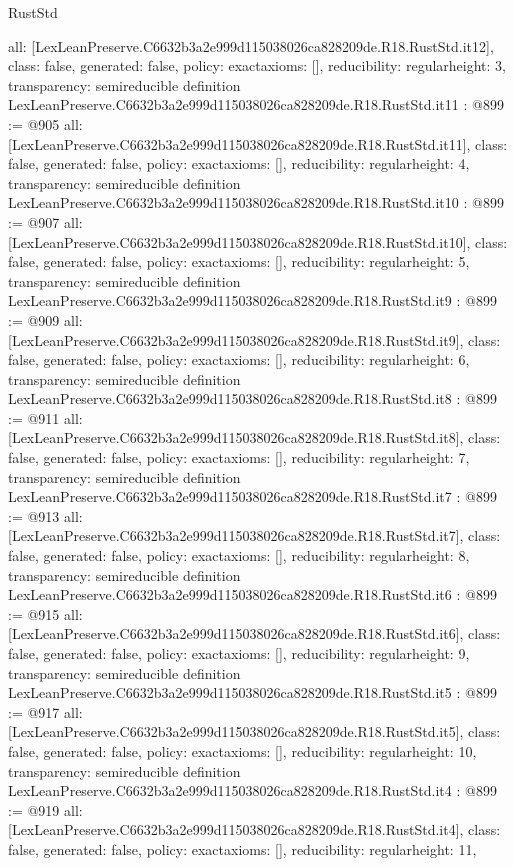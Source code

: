 \begin{lexlean}{RustStd}
\begin{coremodule}
{  all: [LexLeanPreserve.C6632b3a2e999d115038026ca828209de.R18.RustStd.it12],
  class: false,
  generated: false,
  policy: exact{axioms: []},
  reducibility: regular{height: 3},
  transparency: semireducible
}
definition LexLeanPreserve.C6632b3a2e999d115038026ca828209de.R18.RustStd.it11 : @899 := @905 {
  all: [LexLeanPreserve.C6632b3a2e999d115038026ca828209de.R18.RustStd.it11],
  class: false,
  generated: false,
  policy: exact{axioms: []},
  reducibility: regular{height: 4},
  transparency: semireducible
}
definition LexLeanPreserve.C6632b3a2e999d115038026ca828209de.R18.RustStd.it10 : @899 := @907 {
  all: [LexLeanPreserve.C6632b3a2e999d115038026ca828209de.R18.RustStd.it10],
  class: false,
  generated: false,
  policy: exact{axioms: []},
  reducibility: regular{height: 5},
  transparency: semireducible
}
definition LexLeanPreserve.C6632b3a2e999d115038026ca828209de.R18.RustStd.it9 : @899 := @909 {
  all: [LexLeanPreserve.C6632b3a2e999d115038026ca828209de.R18.RustStd.it9],
  class: false,
  generated: false,
  policy: exact{axioms: []},
  reducibility: regular{height: 6},
  transparency: semireducible
}
definition LexLeanPreserve.C6632b3a2e999d115038026ca828209de.R18.RustStd.it8 : @899 := @911 {
  all: [LexLeanPreserve.C6632b3a2e999d115038026ca828209de.R18.RustStd.it8],
  class: false,
  generated: false,
  policy: exact{axioms: []},
  reducibility: regular{height: 7},
  transparency: semireducible
}
definition LexLeanPreserve.C6632b3a2e999d115038026ca828209de.R18.RustStd.it7 : @899 := @913 {
  all: [LexLeanPreserve.C6632b3a2e999d115038026ca828209de.R18.RustStd.it7],
  class: false,
  generated: false,
  policy: exact{axioms: []},
  reducibility: regular{height: 8},
  transparency: semireducible
}
definition LexLeanPreserve.C6632b3a2e999d115038026ca828209de.R18.RustStd.it6 : @899 := @915 {
  all: [LexLeanPreserve.C6632b3a2e999d115038026ca828209de.R18.RustStd.it6],
  class: false,
  generated: false,
  policy: exact{axioms: []},
  reducibility: regular{height: 9},
  transparency: semireducible
}
definition LexLeanPreserve.C6632b3a2e999d115038026ca828209de.R18.RustStd.it5 : @899 := @917 {
  all: [LexLeanPreserve.C6632b3a2e999d115038026ca828209de.R18.RustStd.it5],
  class: false,
  generated: false,
  policy: exact{axioms: []},
  reducibility: regular{height: 10},
  transparency: semireducible
}
definition LexLeanPreserve.C6632b3a2e999d115038026ca828209de.R18.RustStd.it4 : @899 := @919 {
  all: [LexLeanPreserve.C6632b3a2e999d115038026ca828209de.R18.RustStd.it4],
  class: false,
  generated: false,
  policy: exact{axioms: []},
  reducibility: regular{height: 11},
}
\end{coremodule}
\end{lexlean}
